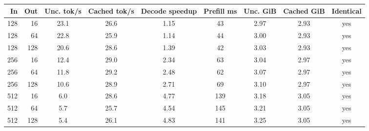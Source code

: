 \begin{tabular}{rrcccccc c}
\hline
In & Out & Unc. tok/s & Cached tok/s & Decode speedup & Prefill ms & Unc. GiB & Cached GiB & Identical \\
\hline
128 & 16 & 23.1 & 26.6 & 1.15 & 43 & 2.97 & 2.93 & yes \\
128 & 64 & 22.8 & 25.9 & 1.14 & 44 & 3.00 & 2.93 & yes \\
128 & 128 & 20.6 & 28.6 & 1.39 & 42 & 3.03 & 2.93 & yes \\
256 & 16 & 12.4 & 29.0 & 2.34 & 63 & 3.04 & 2.97 & yes \\
256 & 64 & 11.8 & 29.2 & 2.48 & 62 & 3.07 & 2.97 & yes \\
256 & 128 & 10.6 & 28.9 & 2.71 & 69 & 3.10 & 2.97 & yes \\
512 & 16 & 6.0 & 28.6 & 4.77 & 139 & 3.18 & 3.05 & yes \\
512 & 64 & 5.7 & 25.7 & 4.54 & 145 & 3.21 & 3.05 & yes \\
512 & 128 & 5.4 & 26.1 & 4.83 & 141 & 3.25 & 3.05 & yes \\
\hline
\end{tabular}
